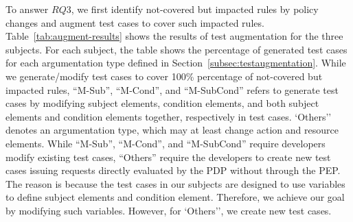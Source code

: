 To answer $RQ3$, we first identify
not-covered but impacted rules by policy changes
and augment test cases to cover such impacted rules.
Table~\ref{tab:augment-results} shows the results of test augmentation for the three subjects.
For each subject, the table shows the percentage of
generated test cases for each argumentation type defined in Section~\ref{subsec:testaugmentation}.
While we generate/modify test cases to cover 100\% percentage of not-covered but impacted rules,
``M-Sub'', ``M-Cond'', and ``M-SubCond'' refers to generate test cases by modifying
subject elements, condition elements, and both subject elements and condition elements together, respectively in test cases.
`Others'' denotes an argumentation type, which
may at least change action and resource elements.
While ``M-Sub'', ``M-Cond'', and ``M-SubCond'' require developers modify existing
test cases, ``Others'' require the developers to create new test cases issuing requests
directly evaluated by the PDP without through the PEP. The reason is because the test cases in our subjects are
designed to use variables to define subject elements and condition element. Therefore,
we achieve our goal by modifying such variables. However, for `Others'', we create
new test cases.


